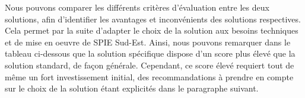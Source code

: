 
Nous pouvons comparer les différents critères d’évaluation entre les deux solutions, afin d’identifier les avantages et inconvénients des solutions respectives. Cela permet par la suite d’adapter le choix de la solution aux besoins techniques et de mise en oeuvre de SPIE Sud-Est. Ainsi, nous pouvons remarquer dans le tableau ci-dessous que la solution spécifique dispose d’un score plus élevé que la solution standard, de façon générale. Cependant, ce score élevé requiert tout de même un fort investissement initial, des recommandations à prendre en compte sur le choix de la solution étant explicités dans le paragraphe suivant.

